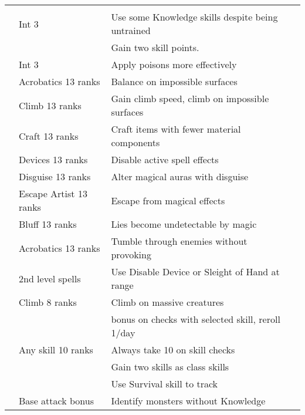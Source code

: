 {\begin{longtabu}{>{\lcol}p{15em} >{\lcol}p{15em} >{\lcol}X >{\lcol}p{10em}}
\midrule
{} &  &  \\
 & Int 3 & Use some Knowledge skills despite being untrained \\
 & \x & Gain two skill points. \\
 & Int 3 & Apply poisons more effectively \\
 & Acrobatics 13 ranks & Balance on impossible surfaces \\
 & Climb 13 ranks & Gain climb speed, climb on impossible surfaces \\
 & Craft 13 ranks & Craft items with fewer material components \\
 & Devices 13 ranks & Disable active spell effects \\
 & Disguise 13 ranks & Alter magical auras with disguise \\
 & Escape Artist 13 ranks & Escape from magical effects \\
 & Bluff 13 ranks & Lies become undetectable by magic \\
 & Acrobatics 13 ranks & Tumble through enemies without provoking \\
 &  2nd level spells & Use Disable Device or Sleight of Hand at range \\
 & Climb 8 ranks & Climb on massive creatures \\
 & \x &   bonus on checks with selected skill, reroll 1/day \\
 & Any skill 10 ranks & Always take 10 on skill checks \\
 & \x & Gain two skills as class skills \\
 & \x &  Use Survival skill to track \\
 & Base attack bonus  & Identify monsters without Knowledge \\


\end{longtabu}}
